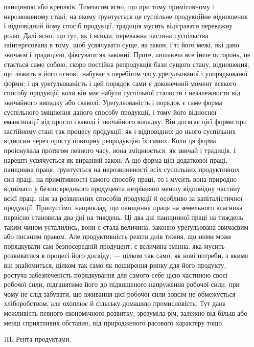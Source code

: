 панщиною або крепаків. Тимчасом ясно, що при тому примітивному і нерозвиненому
стані, на якому ґрунтується це суспільне продукційне відношення і
відповідний йому спосіб продукції, традиція мусить відігравати переважну ролю.
Далі ясно, що тут, як і всюди, переважна частина суспільства заінтересована
в тому, щоб усвячувати суще, як закон, і ті його межі, які дано звичаєм і
традицією, фіксувати як законні. Проте, лишаючи все інше осторонь, це стається
само собою, скоро постійна репродукція бази сущого стану, відношення,
що лежить в його основі, набуває з перебігом часу уреґульованої і упорядкованої
форми; і ця уреґульованість і цей порядок сами є доконечний момент всякого
способу продукції, коли він має набути суспільної сталости і незалежности від
звичайного випадку або сваволі. Уреґульованість і порядок є саме форма суспільного
зміцнення даного способу продукції, і тому його відносної емансипації
від просто сваволі і звичайного випадку. Він досягає цієї форми при застійному
стані так процесу продукції, як і відповідних до нього суспільних відносин
через просту повторну репродукцію їх самих. Коли ця форма проіснувала протягом
певного часу, вона зміцнюється, як звичай і традиція, і нарешті усвячується
як виразний закон. А що форма цієї додаткової праці, панщинна праця,
ґрунтується на нерозвиненості всіх суспільних продуктивних сил праці, на
примітивності самого способу праці, то і мусить вона природно віднімати у
безпосереднього продуцента незрівняно меншу відповідну частину всієї праці,
ніж за розвинених способів продукції й особливо за капіталістичної продукції.
Припустімо, наприклад, що панщинна праця на земельного власника первісно становила
два дні на тиждень. Ці два дні панщинної праці на тиждень таким чином
усталились, вони є стала величина, законно уреґульована звичаєвим або писаним
правом. Але продуктивність решти днів тижня, що ними може порядкувати
сам безпосередній продуцент, є величина змінна, яка мусить розвиватися в
процесі його досвіду, — цілком так само, як нові потреби, з якими він знайомиться,
цілком так само як поширення ринку для його продукту, ростуча забезпеченість
порядкування для самого себе цією частиною своєї робочої сили,
підганятиме його до підвищеного напруження робочої сили, при чому не слід
забувати, що вживання цієї робочої сили зовсім не обмежується хліборобством,
але охоплює й сільську домашню промисловість. Тут дана можливість певного
економічного розвитку, зрозуміла річ, залежно від більш або менш сприятливих
обставин, від природженого расового характеру тощо.

III. Рента продуктами.


